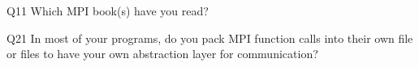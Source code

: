 \begin{description}%
\item{Q11} Which MPI book(s) have you read?%
\item{Q21} In most of your programs, do you pack MPI function calls into their own file or files to have your own abstraction layer for communication?%
\end{description}%
